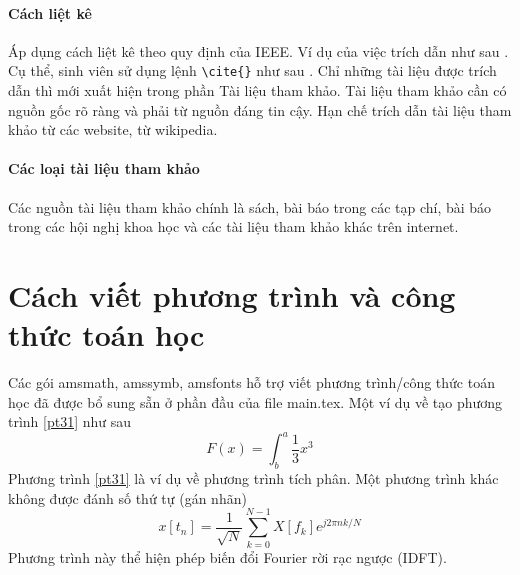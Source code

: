 \paragraph{Cách liệt kê}\mbox{}

Áp dụng cách liệt kê theo quy định của IEEE. Ví dụ của việc trích dẫn như sau \cite{scott2013sdn}. Cụ thể, sinh viên sử dụng lệnh \verb!\cite{}! như sau \cite{ashton2009internet}. Chỉ những tài liệu được trích dẫn thì mới xuất hiện trong phần Tài liệu tham khảo. Tài liệu tham khảo cần có nguồn gốc rõ ràng và phải từ nguồn đáng tin cậy. Hạn chế trích dẫn tài liệu tham khảo từ các website, từ wikipedia.
\paragraph{Các loại tài liệu tham khảo}\mbox{}

Các nguồn tài liệu tham khảo chính là sách, bài báo trong các tạp chí, bài báo trong các hội nghị khoa học và các tài liệu tham khảo khác trên internet.

\section*{Cách viết phương trình và công thức toán học}
Các gói amsmath, amssymb, amsfonts hỗ trợ viết phương trình/công thức toán học đã được bổ sung sẵn ở phần đầu của file main.tex. Một ví dụ về tạo phương trình \eqref{pt31} như sau 
\begin{equation}\label{pt31}
    F(x) = \int^a_b \frac{1}{3}x^3
\end{equation}
Phương trình \ref{pt31} là ví dụ về phương trình tích phân. Một phương trình khác không được đánh số thứ tự (gán nhãn)
\begin{equation*}\label{pt32}
    x[t_n] = \frac{1}{\sqrt{N}} \sum_{k=0}^{N-1}X[f_k]e^{j 2\pi n k/N}
\end{equation*}
Phương trình này thể hiện phép biến đổi Fourier rời rạc ngược (IDFT).
